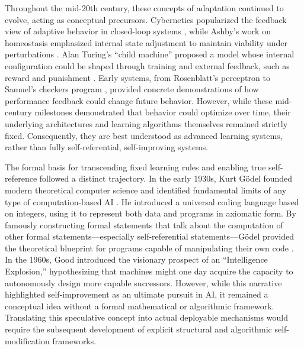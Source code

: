 Throughout the mid-20th century, these concepts of adaptation continued to evolve, acting as conceptual precursors. Cybernetics popularized the feedback view of adaptive behavior in closed-loop systems \citep{wiener1948cybernetics}, while Ashby's work on homeostasis emphasized internal state adjustment to maintain viability under perturbations \citep{ashby1952design}. Alan Turing's ``child machine'' proposed a model whose internal configuration could be shaped through training and external feedback, such as reward and punishment \citep{Turing1948IntelligentMachinery, turing1950computing}. Early systems, from Rosenblatt's perceptron \citep{rosenblatt1958perceptron} to Samuel's checkers program \citep{samuel1959some}, provided concrete demonstrations of how performance feedback could change future behavior. However, while these mid-century milestones demonstrated that behavior could optimize over time, their underlying architectures and learning algorithms themselves remained strictly fixed. Consequently, they are best understood as advanced learning systems, rather than fully self-referential, self-improving systems. 

The formal basis for transcending fixed learning rules and enabling true self-reference followed a distinct trajectory. In the early 1930s, Kurt Gödel founded modern theoretical computer science and identified fundamental limits of any type of computation-based AI \citep{godel1931formal}. He introduced a universal coding language based on integers, using it to represent both data and programs in axiomatic form. By famously constructing formal statements that talk about the computation of other formal statements—especially self-referential statements—Gödel provided the theoretical blueprint for programs capable of manipulating their own code \citep{schmidhuber2022annotated}. In the 1960s, Good \citep{good1966speculations} introduced the visionary prospect of an ``Intelligence Explosion,'' hypothesizing that machines might one day acquire the capacity to autonomously design more capable successors. However, while this narrative highlighted self-improvement as an ultimate pursuit in AI, it remained a conceptual idea without a formal mathematical or algorithmic framework. Translating this speculative concept into actual deployable mechanisms would require the subsequent development of explicit structural and algorithmic self-modification frameworks.

